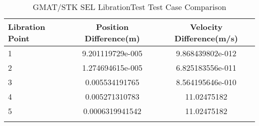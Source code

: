 \begin{table}[htbp!]
\centering
\caption{ GMAT/STK SEL LibrationTest Test Case Comparison}
      \begin{tabular}{lcc}
      \hline\hline
          Libration Point & Position Difference(m) & Velocity Difference(m/s) \\
         \hline
         1 & 9.201119729e-005 & 9.868439802e-012 \\
         2 & 1.274694615e-005 & 6.825183556e-011 \\
         3 & 0.005534191765 & 8.564195646e-010 \\
         4 & 0.005271310783 & 11.02475182 \\
         5 & 0.0006319941542 & 11.02475182 \\
      \hline\hline
      \label{Table: SEL LibrationTest Table} 
\end{tabular}
\end{table}
